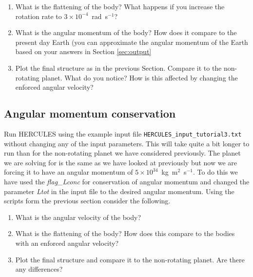 \documentclass[11pt, oneside]{article}   	%
\begin{document}
\begin{enumerate}

\item What is the flattening of the body? What happens if you increase the rotation rate to $3\times10^{-4}$~rad~s$^{-1}$?

\item What is the angular momentum of the body? How does it compare to the present day Earth (you can approximate the angular momentum of the Earth based on your answers in Section \ref{sec:output}

\item Plot the final structure as in the previous Section.  Compare it to the non-rotating planet. What do you notice? How is this affected by changing the enforced angular velocity?

\end{enumerate}

\subsection{Angular momentum conservation}

Run HERCULES using the example input file \texttt{HERCULES\_input\_tutorial3.txt} without changing any of the input parameters.  This will take quite a bit longer to run than for the non-rotating planet we have considered previously. The planet we are solving for is the same as we have looked at previously but now we are forcing it to have an angular momentum of $5\times10^{34}$~kg~m$^2$~s$^{-1}$. To do this we have used the {\it flag\_Lconc} for conservation of angular momentum and changed the parameter {\it Ltot}  in the input file to the desired angular momentum. Using the scripts form the previous section consider the following.

\begin{enumerate}

\item What is the angular velocity of the body?

\item What is the flattening of the body? How does this compare to the bodies with an enforced angular velocity?

\item Plot the final structure and compare it to the non-rotating planet. Are there any differences?

\end{enumerate}
\end{document}
